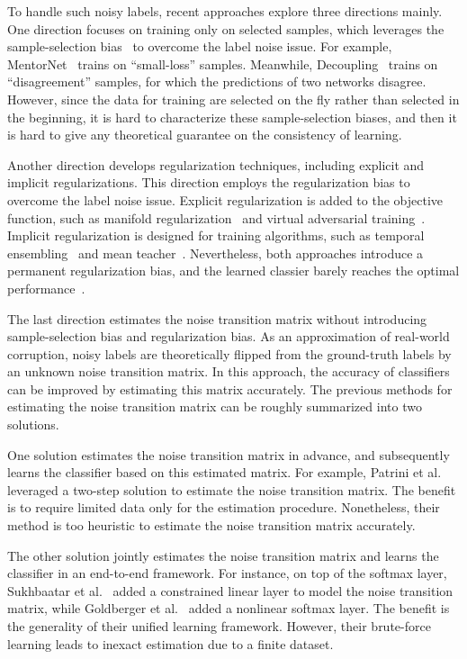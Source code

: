 \documentclass{article}
\begin{document}
To handle such noisy labels, recent approaches explore three directions mainly. One direction focuses on training only on selected samples, which leverages the sample-selection bias~\cite{huang2007correcting} to overcome the label noise issue. For example, MentorNet~\cite{jiang2017mentornet} trains on “small-loss” samples. Meanwhile, Decoupling~\cite{malach2017decoupling} trains on “disagreement” samples, for which the predictions of two networks disagree. However, since the data for training are selected on the fly rather than selected in the beginning, it is hard to characterize these sample-selection biases, and then it is hard to give any theoretical guarantee on the consistency of learning.

Another direction develops regularization techniques, including explicit and implicit regularizations. This direction employs the regularization bias to overcome the label noise issue. Explicit regularization is added to the objective function, such as manifold regularization~\cite{belkin2006manifold} and virtual adversarial training~\cite{miyato2017virtual}. Implicit regularization is designed for training algorithms, such as temporal ensembling~\cite{laine2016temporal} and mean teacher~\cite{tarvainen2017mean}. Nevertheless, both approaches introduce a permanent regularization bias, and the learned classier barely reaches the optimal performance~\cite{domingos1997optimality}.

The last direction estimates the noise transition matrix without introducing sample-selection bias and regularization bias. As an approximation of real-world corruption, noisy labels are theoretically flipped from the ground-truth labels by an unknown noise transition matrix. In this approach, the accuracy of classifiers can be improved by estimating this matrix accurately. The previous methods for estimating the noise transition matrix can be roughly summarized into two solutions.

One solution estimates the noise transition matrix in advance, and subsequently learns the classifier based on this estimated matrix. For example, Patrini et al.~\cite{patrini2017making} leveraged a two-step solution to estimate the noise transition matrix. The benefit is to require limited data only for the estimation procedure. Nonetheless, their method is too heuristic to estimate the noise transition matrix accurately.

The other solution jointly estimates the noise transition matrix and learns the classifier in an end-to-end framework. For instance, on top of the softmax layer, Sukhbaatar et al.~\cite{sukhbaatar2014training} added a constrained linear layer to model the noise transition matrix, while Goldberger et al.~\cite{goldberger2016training} added a nonlinear softmax layer. The benefit is the generality of their unified learning framework. However, their brute-force learning leads to inexact estimation due to a finite dataset.
\end{document}
